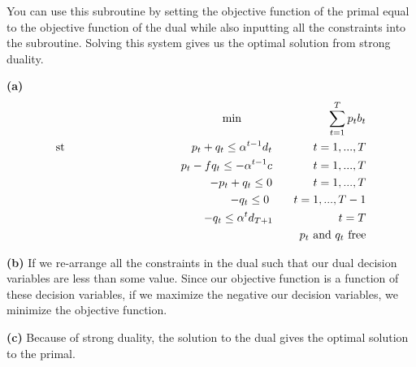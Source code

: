 \documentclass[12pt]{article}
\newenvironment{problem}[2][Problem]{\begin{trivlist}
\item[\hskip \labelsep {\bfseries #1}\hskip \labelsep {\bfseries #2.}]}{\end{trivlist}}
\newenvironment{subproblem}[1]{\textbf{(#1)}}{}
\theoremstyle{definition}
\begin{document}
\begin{problem}{3}
You can use this subroutine by setting the objective function of the primal equal to the objective function of the dual while also inputting all the constraints into the subroutine.
Solving this system gives us the optimal solution from strong duality.
\end{problem}

\begin{problem}{4}

\begin{subproblem}{a}
\begin{align*}
\text{min \hspace{1in}} \sum^T_{t=1} p_tb_t \\
\text{st \hspace{1.5in}} p_t+q_t \leq \alpha^{t-1}d_t \hspace{0.5in} t=1,...,T \\
p_t-fq_t \leq -\alpha^{t-1}c \hspace{0.5in} t=1,...,T \\
-p_t+q_t \leq 0 \hspace{0.5in} t=1,...,T \\
-q_t \leq 0 \hspace{0.3in} t=1,...,T-1 \\
-q_t \leq \alpha^td_{T+1} \hspace{0.8in} t=T \\
p_t \text{ and } q_t \text{ free}
\end{align*}
\end{subproblem}

\begin{subproblem}{b}
If we re-arrange all the constraints in the dual such that our dual decision variables are less than some value.
Since our objective function is a function of these decision variables, if we maximize the negative our decision variables, we minimize the objective function.
\end{subproblem}

\begin{subproblem}{c}
Because of strong duality, the solution to the dual gives the optimal solution to the primal.
\end{subproblem}

\end{problem}
\end{document}
